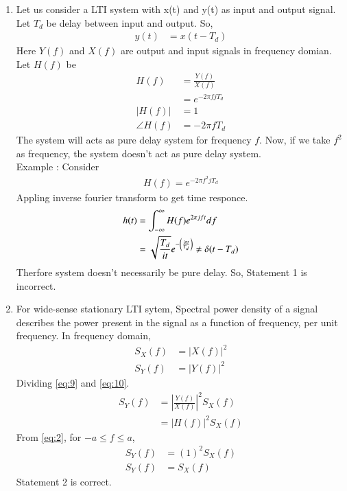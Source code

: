 \documentclass[journal,12pt,twocolumn]{IEEEtran}
\theoremstyle{remark}
\begin{document}
\begin{enumerate}
\item Let us consider a LTI system with x(t) and y(t) as input and output signal. Let $T_d$ be delay between input and output. So,
\begin{align}
y(t)&=x(t-T_d)
\end{align}
Here $Y(f)$ and $X(f)$ are output and input signals in frequency domian. Let $H(f)$ be 
\begin{align}
H(f)&=\frac{Y(f)}{X(f)}\\
&=e^{-2\pi fjT_d}\\
\label{eq:2}
|H(f)|&=1\\
\angle H(f)&=-2\pi fT_d
\label{eq:7}
\end{align}
The system will acts as pure delay system for frequency $f$. Now, if we take $f^2$ as frequency, the system doesn't act as pure delay system.\\
Example : Consider 
\begin{align}
H(f)=e^{-2\pi f^2jT_d}
\end{align}
Appling inverse fourier transform to get time responce.
\begin{align}
h(t)&=\int_{-\infty}^{\infty}H(f)e^{2\pi jft}df\\
&=\sqrt{\frac{T_d}{it}}e^{-\left(\frac{i\pi t}{T_d}\right)} \ne \delta(t-T_d)
\end{align}
Therfore system doesn't necessarily be pure delay.
So, Statement 1 is incorrect.
\item For wide-sense stationary LTI sytem, Spectral power density of a signal describes the power present in the signal as a function of frequency, per unit frequency. In frequency domain,
\begin{align}
S_X(f)&=|X(f)|^2
\label{eq:9}\\
S_Y(f)&=|Y(f)|^2
\label{eq:10}
\end{align}
Dividing \eqref{eq:9} and \eqref{eq:10}.
\begin{align}
S_Y(f)&=\left|\frac{Y(f)}{X(f)}\right|^2S_X(f)\\
&=|H(f)|^2S_X(f)
\end{align}
From \eqref{eq:2}, for $-a \leq f \leq a$,
\begin{align}
S_Y(f)&=(1)^2S_X(f)\\
S_Y(f)&=S_X(f)
\end{align}
Statement 2 is correct.
\end{enumerate}
\end{document}
